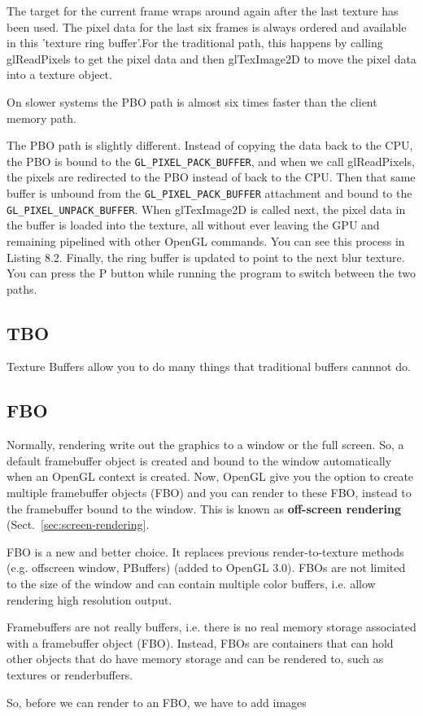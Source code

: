 The target for the current frame wraps around again after the last
texture has been used. The pixel data for the last six frames is
always ordered and available in this 'texture ring buffer'.For the
traditional path, this happens by calling glReadPixels to get the
pixel data and then glTexImage2D to move the pixel data into a texture
object.

\begin{framed}
  On slower systems the PBO path is almost six times faster than the
  client memory path.
\end{framed}
The PBO path is slightly different. Instead of copying the data back
to the CPU, the PBO is bound to the \verb!GL_PIXEL_PACK_BUFFER!, and
when we call glReadPixels, the pixels are redirected to the PBO
instead of back to the CPU. Then that same buffer is unbound from the
\verb!GL_PIXEL_PACK_BUFFER! attachment and bound to the
\verb!GL_PIXEL_UNPACK_BUFFER!. When glTexImage2D is called next, the
pixel data in the buffer is loaded into the texture, all without ever
leaving the GPU and remaining pipelined with other OpenGL commands.
You can see this process in Listing 8.2. Finally, the ring buffer is
updated to point to the next blur texture. You can press the P button
while running the program to switch between the two paths.

\subsection{TBO }
\label{sec:tbo-}

Texture Buffers allow you to do many things that traditional buffers
cannnot do. 

\subsection{FBO}
\label{sec:fbo}


Normally, rendering write out the graphics to a window or the full
screen. So, a default framebuffer object is created and bound to the
window automatically when an OpenGL context is created.  Now, OpenGL
give you the option to create multiple framebuffer objects (FBO) and
you can render to these FBO, instead to the framebuffer bound to the
window. This is known as {\bf off-screen rendering}
(Sect.~\ref{sec:screen-rendering}.

FBO is a new and better choice. It replaces previous render-to-texture
methods (e.g. offscreen window, PBuffers) (added to OpenGL 3.0). FBOs
are not limited to the size of the window and can contain multiple
color buffers, i.e. allow rendering high resolution output.
\begin{framed}
  Framebuffers are not really buffers, i.e. there is no real memory
  storage associated with a framebuffer object (FBO). Instead, FBOs
  are containers that can hold other objects that do have memory
  storage and can be rendered to, such as textures or renderbuffers. 

  So, before we can render to an FBO, we have to add images
\end{framed}


